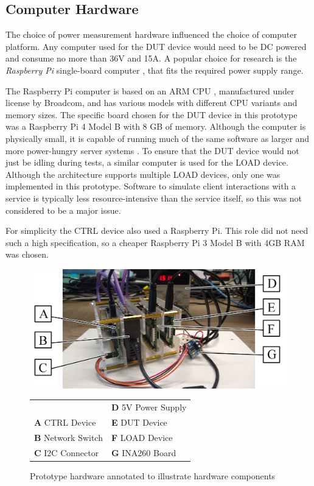 \subsection{Computer Hardware}

The choice of power measurement hardware influenced the choice of computer platform. Any computer used for the DUT device would need to be DC powered  and consume no more than 36V and 15A. A popular choice for research is the \emph{Raspberry Pi} single-board computer \citep{RaspberryPi}, that fits the required power supply range.

The Raspberry Pi computer is based on an ARM CPU \citep{ARM}, manufactured under license by Broadcom, and has various models with different CPU variants and memory sizes. The specific board chosen for the DUT device in this prototype was a Raspberry Pi 4 Model B with 8 GB of memory. Although the computer is physically small, it is capable of running much of the same software as larger and more power-hungry server systems \citep{Varghese2015}. To ensure that the DUT device would not just be idling during tests, a similar computer is used for the LOAD device. Although the architecture supports multiple LOAD devices, only one was implemented in this prototype. Software to simulate client interactions with a service is typically less resource-intensive than the service itself, so this was not considered to be a major issue.

For simplicity the CTRL device also used a Raspberry Pi. This role did not need such a high specification, so a cheaper Raspberry Pi 3 Model B with 4GB RAM was chosen. 

\begin{figure}[htbp]
  \centering
  \includegraphics[width=\columnwidth]{Figures/rig/testrig-annotated-1.png}
  \label{hardware}
  \begin{tabular}{|ll|}
  \hline
                                   & \textbf{D} \quad 5V Power Supply \\
  \textbf{A} \quad CTRL Device     & \textbf{E} \quad DUT Device \\
  \textbf{B} \quad Network Switch  & \textbf{F} \quad LOAD Device \\
  \textbf{C} \quad I2C Connector   & \textbf{G} \quad INA260 Board \\
  \hline
  \end{tabular}
  \caption{Prototype hardware annotated to illustrate hardware components}
\end{figure}

